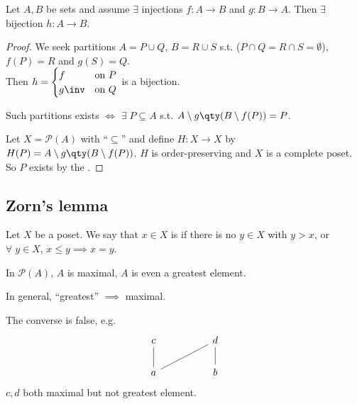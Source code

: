 \begin{corollary}
    Let $A, B$ be sets and assume $\exists$ injections $f \colon A \to B$ and $g \colon B \to A$.
    Then $\exists$ bijection $h : A \to B$.
\end{corollary}

\begin{proof}
    We seek partitions $A = P \cup Q$, $B = R \cup S$ s.t. ($P \cap Q = R \cap S = \emptyset$), $f(P) = R$ and $g(S) = Q$. \\
    Then $h = \begin{cases}
        f & \text{on } P \\
        g\inv & \text{on } Q
    \end{cases}$ is a bijection.

    Such partitions exists $\iff$ $\exists \; P \subseteq A$ s.t. $A \setminus g\qty(B \setminus f(P)) = P$.

    Let $X = \mathcal{P}(A)$ with ``$\subseteq$'' and define $H : X \to X$ by $H(P) = A \setminus g\qty(B \setminus f(P))$.
    $H$ is order-preserving and $X$ is a complete poset.
    So $P$ exists by the .
\end{proof}

\subsection{Zorn's lemma}
\begin{definition}[Maximal]
    Let $X$ be a poset.
    We say that $x \in X$ is  if there is no $y \in X$ with $y > x$, or $\forall \; y \in X$, $x \leq y \implies x = y$.
\end{definition}

\begin{example}
    In $\mathcal{P}(A)$, $A$ is maximal, $A$ is even a greatest element.
\end{example}

\begin{note}
    In general, ``greatest'' $\implies$ maximal.

    The converse is false, e.g.
    \[\begin{tikzcd}
        c && d \\
        a && b
        \arrow[no head, from=2-1, to=1-1]
        \arrow[no head, from=2-3, to=1-3]
        \arrow[no head, from=2-1, to=1-3]
    \end{tikzcd}\]
    $c, d$ both maximal but not greatest element.
\end{note}

